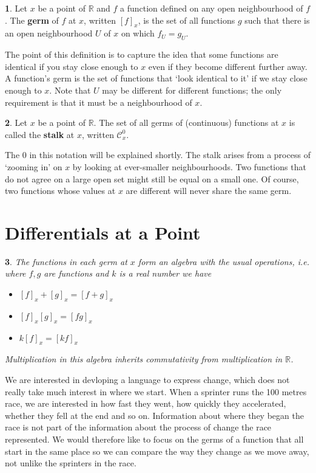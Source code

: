 \documentclass[oneside,english]{amsbook}
\numberwithin{section}{chapter}
\theoremstyle{plain}
\newtheorem{thm}{\protect\theoremname}
\theoremstyle{definition}
\newtheorem{defn}[thm]{\protect\definitionname}
\providecommand{\definitionname}{Definition}
\providecommand{\theoremname}{Theorem}
\begin{document}
			\begin{defn}
				Let $x$ be a point of $\mathbb{R}$ and $f$ a function defined on any open neighbourhood of $f$. The \textbf{germ} of $f$ at $x$, written $[f]_x$, is the set of all functions $g$ such that there is an open neighbourhood $U$ of $x$ on which $f_U = g_U$.  
			\end{defn}
			
			The point of this definition is to capture the idea that some functions are identical if you stay close enough to $x$ even if they become different further away. A function's germ is the set of functions that `look identical to it' if we stay close enough to $x$. Note that $U$ may be different for different functions; the only requirement is that it must be a neighbourhood of $x$.
			
			\begin{defn}
				Let $x$ be a point of $\mathbb{R}$. The set of all germs of (continuous) functions at $x$ is called the \textbf{stalk} at $x$, written $\mathscr{C}^0_x$.
			\end{defn}
			
			The 0 in this notation will be explained shortly. The stalk arises from a process of `zooming in' on $x$ by looking at ever-smaller neighbourhoods. Two functions that do not agree on a large open set might still be equal on a small one. Of course, two functions whose values at $x$ are different will never share the same germ. 
			
		\section{Differentials at a Point}
		
			\begin{thm}
				The functions in each germ at $x$ form an algebra with the usual operations, i.e. where $f, g$ are functions and $k$ is a real number we have
				\begin{itemize}
					\item{$[f]_x + [g]_x = [f + g]_x$}
					\item{$[f]_x [g]_x = [fg]_x$}
					\item{$k[f]_x = [kf]_x$}
				\end{itemize}
				Multiplication in this algebra inherits commutativity from multiplication in $\mathbb{R}$.
			\end{thm}
			
			We are interested in devloping a language to express change, which does not really take much interest in where we start. When a sprinter runs the 100 metres race, we are interested in how fast they went, how quickly they accelerated, whether they fell at the end and so on. Information about where they began the race is not part of the information about the process of change the race represented. We would therefore like to focus on the germs of a function that all start in the same place so we can compare the way they change as we move away, not unlike the sprinters in the race.
			
\end{document}
